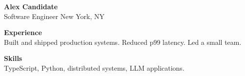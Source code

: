 \documentclass[11pt]{article}
\begin{document}
\begin{center}
  {\Large \textbf{Alex Candidate}}\\
  Software Engineer \textbullet{} New York, NY
\end{center}

\noindent\textbf{Experience}\\
Built and shipped production systems. Reduced p99 latency. Led a small team.

\noindent\textbf{Skills}\\
TypeScript, Python, distributed systems, LLM applications.
\end{document}
